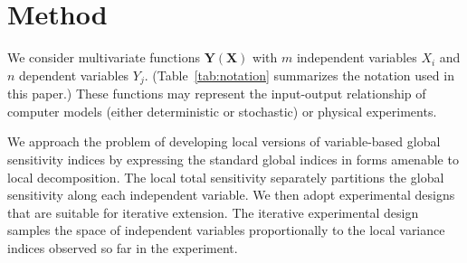 \documentclass[12pt]{article}
\begin{document}
\section{Method}

We consider multivariate functions $\mathbf{Y} \left( \mathbf{X} \right)$ with $m$ independent variables $X_i$ and $n$ dependent variables $Y_j$. (Table~\ref{tab:notation} summarizes the notation used in this paper.) These functions may represent the input-output relationship of computer models (either deterministic or stochastic) or physical experiments.

We approach the problem of developing local versions of variable-based global sensitivity indices by expressing the standard global indices \cite{saltelli_variance_2010} in forms amenable to local decomposition. The local total sensitivity separately partitions the global sensitivity along each independent variable. We then adopt experimental designs that are suitable for iterative extension. The iterative experimental design samples the space of independent variables proportionally to the local variance indices observed so far in the experiment.
\end{document}
